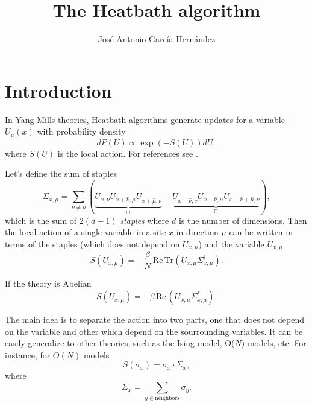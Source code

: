\documentclass[12pt,a4paper]{article}
\author{José Antonio García Hernández}
\title{The Heatbath algorithm}
\newcommand*{\Real}{\,\text{Re}}
\begin{document}
\maketitle
\section{Introduction}
In Yang Mills theories, Heatbath algorithms \cite{creutz1980} generate updates for a variable $U_{\mu}(x)$ with probability density
\begin{equation}    
    dP(U) \propto \exp(-S(U))dU,
\end{equation}
where $S(U)$ is the local action. For references see \cite{gattringer, knechtli}.

Let's define the sum of staples
\begin{equation}
\label{eq:staples}
    \Sigma_{x,\mu} = \sum_{\nu\ne\mu} \left( \underbrace{U_{x,\nu}U_{x+\hat\nu,\mu}U^{\dagger}_{x+\hat\mu,\nu}}_{\sqcup} + \underbrace{U^{\dagger}_{x-\hat\nu,\nu}U_{x-\hat\nu,\mu}U_{x-\hat\nu+\hat\mu,\nu}}_{\sqcap}\right),
\end{equation}
which is the sum of $2(d-1)$ \textit{staples} where $d$ is the number of dimensions. Then the local action of a single variable in a site $x$ in direction $\mu$ can be written in terms of the staples (which does not depend on $U_{x,\mu}$) and the variable $U_{x,\mu}$
\begin{equation}
    S(U_{x,\mu}) = -\frac{\beta}{N} \Real\, \text{Tr} (U_{x,\mu}\Sigma^{\dagger}_{x,\mu}).
\end{equation}

If the theory is Abelian
\begin{equation}
    S(U_{x,\mu}) = -\beta \Real \, (U_{x,\mu}\Sigma^*_{x,\mu}).
\end{equation}


The main idea is to separate the action into two parts, one that does not depend on the variable and other which depend on the sourrounding variables. It can be easily generalize to other theories, such as the Ising model, O($N$) models, etc.
 For instance, for $O(N)$ models
\begin{equation}
    S(\sigma_x) = \sigma_x\cdot\Sigma_x,
\end{equation} 
 where
\begin{equation}
    \Sigma_x = \sum_{y\in\text{neighbors}} \sigma_y . 
\end{equation}
 
\end{document}
